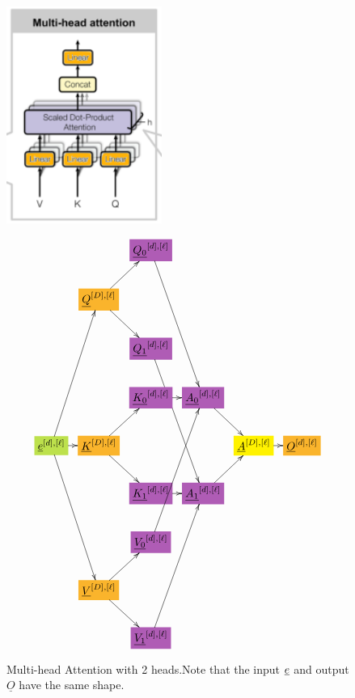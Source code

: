 \begin{figure}[h!]\centering
\begin{minipage}{.35\linewidth}
\includegraphics[width=2in]{transformer/multi-head-att.png}
\end{minipage}%
\begin{minipage}{.65\linewidth}
$$\xymatrix@C=0.7pc{
&&*+[F*:Orchid]{\underline{Q_0}^{[d],[\ell]}}\ar[dddr]&&&
\\
&*+[F*:Dandelion]{\underline{Q}^{[D], [\ell]}}\ar[ur]\ar[dr]&&&&
\\
&&*+[F*:Orchid]{\underline{Q_1}^{[d],[\ell]}}\ar[dddr]&&&
\\
&&*+[F*:Orchid]{\underline{K_0}^{[d],[\ell]}}\ar[r]&*+[F*:Orchid]{\underline{A_0}^{[d],[\ell]}}\ar[dr]&&
\\
*+[F*:SpringGreen]{\underline{e}^{[d], [\ell]}}\ar[r]\ar[uuur]\ar[dddr]&*+[F*:Dandelion]{\underline{K}^{[D], [\ell]}}\ar[ur]\ar[dr]&&&*+[F*:yellow]{\underline{A}^{[D],[\ell]}}\ar[r]&*+[F*:Dandelion]{\underline{O}^{[d],[\ell]}}
\\
&&*+[F*:Orchid]{\underline{K_1}^{[d],[\ell]}}\ar[r]&*+[F*:Orchid]{\underline{A_1}^{[d],[\ell]}}\ar[ur]&&
\\
&&*+[F*:Orchid]{\underline{V_0}^{[d],[\ell]}}\ar[uuur]&&&
\\
&*+[F*:Dandelion]{\underline{V}^{[D], [\ell]}}\ar[ur]\ar[dr]&&&&
\\
&&*+[F*:Orchid]{\underline{V_1}^{[d],[\ell]}}\ar[uuur]&&&
}$$
\end{minipage}
\caption{Multi-head Attention with 2 heads.Note that the input ${\underline{e}}$ and output $\underline{O}$ have the same shape.}
\label{fig-texnn-for-multi-head-att}
\end{figure}

